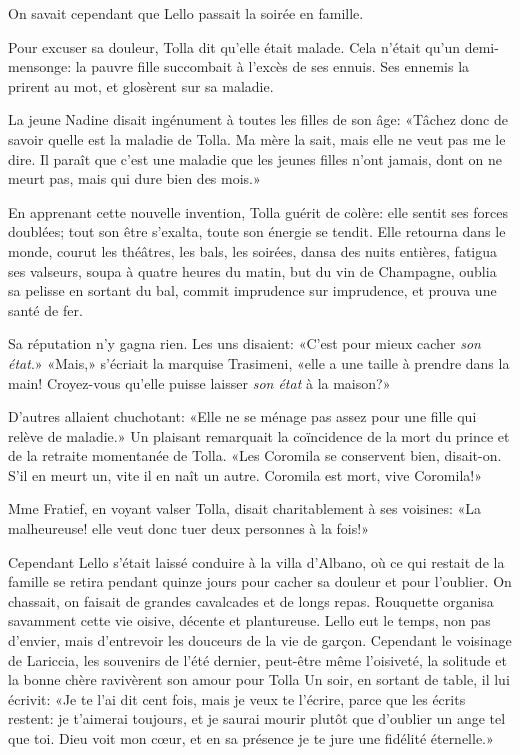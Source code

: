 On savait cependant que Lello passait la soirée en famille.

Pour excuser sa douleur, Tolla dit qu'elle était malade. Cela n'était
qu'un demi-mensonge: la pauvre fille succombait à l'excès de ses ennuis.
Ses ennemis la prirent au mot, et glosèrent sur sa maladie.

La jeune Nadine disait ingénument à toutes les filles de son âge:
«Tâchez donc de savoir quelle est la maladie de Tolla. Ma mère la sait,
mais elle ne veut pas me le dire. Il paraît que c'est une maladie que
les jeunes filles n'ont jamais, dont on ne meurt pas, mais qui dure bien
des mois.»

En apprenant cette nouvelle invention, Tolla guérit de colère: elle
sentit ses forces doublées; tout son être s'exalta, toute son énergie se
tendit. Elle retourna dans le monde, courut les théâtres, les bals, les
soirées, dansa des nuits entières, fatigua ses valseurs, soupa à quatre
heures du matin, but du vin de Champagne, oublia sa pelisse en sortant
du bal, commit imprudence sur imprudence, et prouva une santé de fer.

Sa réputation n'y gagna rien. Les uns disaient: «C'est pour mieux cacher
\emph{son état}.» «Mais,» s'écriait la marquise Trasimeni, «elle a une
taille à prendre dans la main! Croyez-vous qu'elle puisse laisser
\emph{son état} à la maison?»

D'autres allaient chuchotant: «Elle ne se ménage pas assez pour une
fille qui relève de maladie.» Un plaisant remarquait la coïncidence de
la mort du prince et de la retraite momentanée de Tolla. «Les Coromila
se conservent bien, disait-on. S'il en meurt un, vite il en naît un
autre. Coromila est mort, vive Coromila!»

Mme Fratief, en voyant valser Tolla, disait charitablement à ses
voisines: «La malheureuse! elle veut donc tuer deux personnes à la
fois!»

Cependant Lello s'était laissé conduire à la villa d'Albano, où ce qui
restait de la famille se retira pendant quinze jours pour cacher sa
douleur et pour l'oublier. On chassait, on faisait de grandes cavalcades
et de longs repas. Rouquette organisa savamment cette vie oisive,
décente et plantureuse. Lello eut le temps, non pas d'envier, mais
d'entrevoir les douceurs de la vie de garçon. Cependant le voisinage de
Lariccia, les souvenirs de l'été dernier, peut-être même l'oisiveté, la
solitude et la bonne chère ravivèrent son amour pour Tolla Un soir, en
sortant de table, il lui écrivit: «Je te l'ai dit cent fois, mais je
veux te l'écrire, parce que les écrits restent: je t'aimerai toujours,
et je saurai mourir plutôt que d'oublier un ange tel que toi. Dieu voit
mon cœur, et en sa présence je te jure une fidélité éternelle.»

